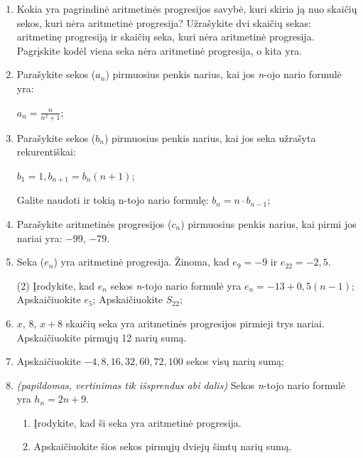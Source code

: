 \documentclass[a4paper]{article}
\begin{document}
\begin{enumerate}
      \item Kokia yra pagrindinė aritmetinės progresijos savybė, kuri skiria ją
            nuo skaičių sekos, kuri nėra aritmetinė progresija? Užrašykite dvi
            skaičių sekas: aritmetinę progresiją ir skaičių seka, kuri nėra
            aritmetinė progresija. Pagrįskite kodėl viena seka nėra
            aritmetinė progresija, o kita yra.

      \item Parašykite sekos ($a_{n}$) pirmuosius penkis
            narius, kai jos \textit{n}-ojo nario formulė yra:

            $a_{n}=\frac{n}{n^{2} + 1}$;

      \item Parašykite sekos ($b_{n}$) pirmuosius penkis
            narius, kai jos seka užrašyta rekurentiškai:

            $b_1 = 1, b_{n+1}=b_{n}(n+1)$;

            Galite naudoti ir tokią n-tojo nario formulę: $b_{n}=n \cdot
                  b_{n-1}$;

      \item Parašykite aritmetinės progresijos ($c_{n}$) pirmuosius penkis
            narius, kai pirmi jos nariai yra: $-99$, $-79$.

      \item Seka ($e_{n}$) yra aritmetinė progresija. Žinoma, kad $e_{9}=-9$ ir
            $e_{22}=-2,5$.

            \begin{tasks}[item-format={\normalfont}, after-item-skip=2mm](2)
                  \task* Įrodykite, kad $e_{n}$ sekos \textit{n}-tojo nario
                  formulė yra $e_{n}=-13+0,5(n-1)$;
                  \task Apskaičiuokite $e_{5}$;
                  \task Apskaičiuokite $S_{22}$;
            \end{tasks}

      \item $ x $, $ 8 $, $ x + 8$ skaičių seka yra aritmetinės progresijos
            pirmieji trys nariai. Apskaičiuokite pirmųjų 12 narių sumą.

      \item Apskaičiuokite $ -4, 8, 16, 32, 60, 72, 100 $ sekos visų narių sumą;

      \item \textit{(papildomas, vertinimas tik išsprendus abi dalis)} Sekos
            \textit{n}-tojo nario formulė yra
            $h_{n} = 2n+9$.
            \begin{enumerate}[label= (\alph*)]
                  \item Įrodykite, kad ši seka yra aritmetinė progresija.
                  \item Apskaičiuokite šios sekos pirmųjų dviejų šimtų narių
                        sumą.
            \end{enumerate}
\end{enumerate}
\end{document}
